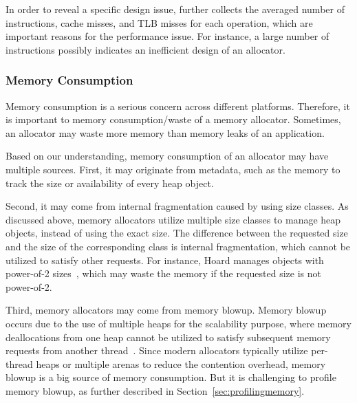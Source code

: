 In order to reveal a specific design issue, \MP{} further collects the averaged number of instructions, cache misses, and TLB misses for each operation, which are important reasons for the performance issue. For instance, a large number of instructions possibly indicates an inefficient design of an allocator. 

\subsubsection{Memory Consumption}
\label{sec:memoryconsumption}

Memory consumption is a serious concern across different platforms. Therefore, it is important to memory consumption/waste of a memory allocator. Sometimes, an allocator may waste more memory than memory leaks of an application. 

Based on our understanding, memory consumption of an allocator may have multiple sources. First, it may originate from metadata, such as the memory to track the size or availability of every heap object. 


Second, it may come from internal fragmentation caused by using size classes.  As discussed above, memory allocators utilize multiple size classes to manage heap objects, instead of using the exact size. The difference between the requested size and the size of the corresponding class is internal fragmentation, which cannot be utilized to satisfy other requests. For instance, Hoard manages objects with power-of-2 sizes~\citep{Hoard}, which may waste the memory if the requested size is not power-of-2. 
 
Third, memory allocators may come from memory blowup. Memory blowup occurs due to the use of multiple heaps for the scalability purpose, where memory deallocations from one heap cannot be utilized to satisfy  subsequent memory requests from another thread~\cite{Hoard}. 
Since modern allocators typically utilize per-thread heaps or multiple arenas to reduce the contention overhead, memory blowup is a big source of memory consumption. But it is challenging to profile memory blowup, as further described in Section~\ref{sec:profilingmemory}.   

